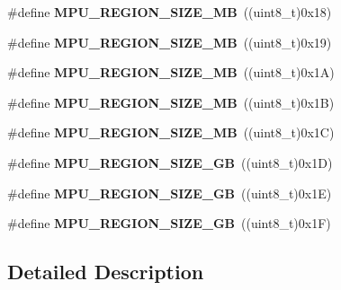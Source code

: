 \begin{DoxyCompactItemize}
\item 
\#define {\bfseries M\+P\+U\+\_\+\+R\+E\+G\+I\+O\+N\+\_\+\+S\+I\+Z\+E\+\_\+MB}~((uint8\+\_\+t)0x18)\hypertarget{group___c_o_r_t_e_x___m_p_u___region___size_ga597f9c43fbfa8fc5d1090421e608f17b}{}\label{group___c_o_r_t_e_x___m_p_u___region___size_ga597f9c43fbfa8fc5d1090421e608f17b}

\item 
\#define {\bfseries M\+P\+U\+\_\+\+R\+E\+G\+I\+O\+N\+\_\+\+S\+I\+Z\+E\+\_\+MB}~((uint8\+\_\+t)0x19)\hypertarget{group___c_o_r_t_e_x___m_p_u___region___size_ga22709da2b76dfd385b203cbc5f8a6d96}{}\label{group___c_o_r_t_e_x___m_p_u___region___size_ga22709da2b76dfd385b203cbc5f8a6d96}

\item 
\#define {\bfseries M\+P\+U\+\_\+\+R\+E\+G\+I\+O\+N\+\_\+\+S\+I\+Z\+E\+\_\+MB}~((uint8\+\_\+t)0x1\+A)\hypertarget{group___c_o_r_t_e_x___m_p_u___region___size_ga7da8440ac3caafe398a361bfb189f665}{}\label{group___c_o_r_t_e_x___m_p_u___region___size_ga7da8440ac3caafe398a361bfb189f665}

\item 
\#define {\bfseries M\+P\+U\+\_\+\+R\+E\+G\+I\+O\+N\+\_\+\+S\+I\+Z\+E\+\_\+MB}~((uint8\+\_\+t)0x1\+B)\hypertarget{group___c_o_r_t_e_x___m_p_u___region___size_gadc08a4fba8098ee17c45360ebff087a4}{}\label{group___c_o_r_t_e_x___m_p_u___region___size_gadc08a4fba8098ee17c45360ebff087a4}

\item 
\#define {\bfseries M\+P\+U\+\_\+\+R\+E\+G\+I\+O\+N\+\_\+\+S\+I\+Z\+E\+\_\+MB}~((uint8\+\_\+t)0x1\+C)\hypertarget{group___c_o_r_t_e_x___m_p_u___region___size_ga372869d4349d7b1c2fe58479102eb7b6}{}\label{group___c_o_r_t_e_x___m_p_u___region___size_ga372869d4349d7b1c2fe58479102eb7b6}

\item 
\#define {\bfseries M\+P\+U\+\_\+\+R\+E\+G\+I\+O\+N\+\_\+\+S\+I\+Z\+E\+\_\+GB}~((uint8\+\_\+t)0x1\+D)\hypertarget{group___c_o_r_t_e_x___m_p_u___region___size_ga0f3c024d66b9dd913fbc4b07baa6a359}{}\label{group___c_o_r_t_e_x___m_p_u___region___size_ga0f3c024d66b9dd913fbc4b07baa6a359}

\item 
\#define {\bfseries M\+P\+U\+\_\+\+R\+E\+G\+I\+O\+N\+\_\+\+S\+I\+Z\+E\+\_\+GB}~((uint8\+\_\+t)0x1\+E)\hypertarget{group___c_o_r_t_e_x___m_p_u___region___size_gaf0588e5b48bfd695436a11557aa17551}{}\label{group___c_o_r_t_e_x___m_p_u___region___size_gaf0588e5b48bfd695436a11557aa17551}

\item 
\#define {\bfseries M\+P\+U\+\_\+\+R\+E\+G\+I\+O\+N\+\_\+\+S\+I\+Z\+E\+\_\+GB}~((uint8\+\_\+t)0x1\+F)\hypertarget{group___c_o_r_t_e_x___m_p_u___region___size_ga9bc3af13c284cce385890b5439bad130}{}\label{group___c_o_r_t_e_x___m_p_u___region___size_ga9bc3af13c284cce385890b5439bad130}

\end{DoxyCompactItemize}


\subsection{Detailed Description}
